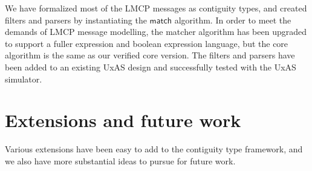 \documentclass[a4paper,UKenglish,cleveref, autoref, thm-restate]{lipics-v2021}
\newcommand{\konst}[1]{\ensuremath{\mathsf{#1}}}
\begin{document}
We have formalized most of the LMCP messages as contiguity types, and
created filters and parsers by instantiating the \konst{match}
algorithm. In order to meet the demands of LMCP message modelling, the
matcher algorithm has been upgraded to support a fuller expression and
boolean expression language, but the core algorithm is the same as our
verified core version. The filters and parsers have been added to an
existing UxAS design and successfully tested with the UxAS simulator.

\section{Extensions and future work}

Various extensions have been easy to add to the contiguity type
framework, and we also have more substantial ideas to pursue for
future work.
\end{document}
